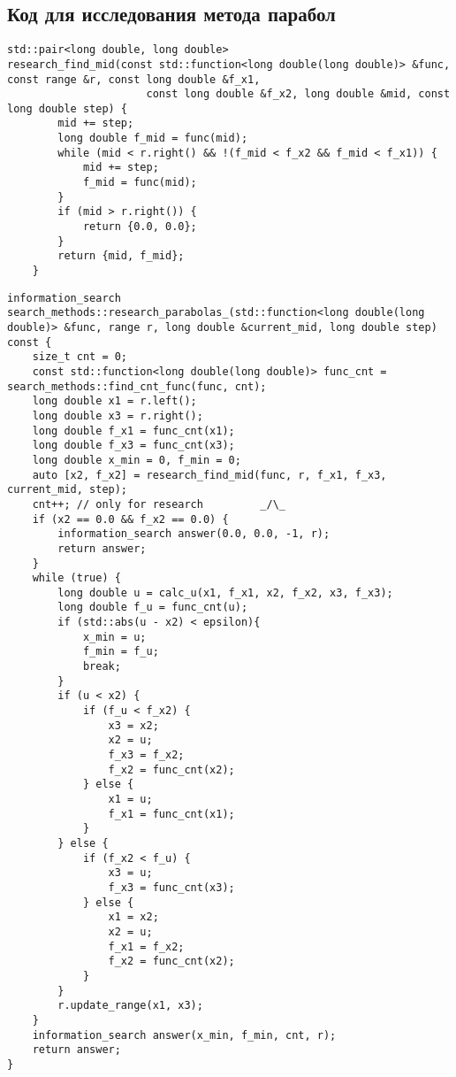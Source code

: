 \newpage
\subsection{Код для исследования метода парабол}
\begin{lstlisting}
std::pair<long double, long double>
research_find_mid(const std::function<long double(long double)> &func, const range &r, const long double &f_x1,
                      const long double &f_x2, long double &mid, const long double step) {
        mid += step;
        long double f_mid = func(mid);
        while (mid < r.right() && !(f_mid < f_x2 && f_mid < f_x1)) {
            mid += step;
            f_mid = func(mid);
        }
        if (mid > r.right()) {
            return {0.0, 0.0};
        }
        return {mid, f_mid};
    }
\end{lstlisting}

\begin{lstlisting}
information_search search_methods::research_parabolas_(std::function<long double(long double)> &func, range r, long double &current_mid, long double step) const {
    size_t cnt = 0;
    const std::function<long double(long double)> func_cnt = search_methods::find_cnt_func(func, cnt);
    long double x1 = r.left();
    long double x3 = r.right();
    long double f_x1 = func_cnt(x1);
    long double f_x3 = func_cnt(x3);
    long double x_min = 0, f_min = 0;
    auto [x2, f_x2] = research_find_mid(func, r, f_x1, f_x3, current_mid, step);
    cnt++; // only for research         _/\_
    if (x2 == 0.0 && f_x2 == 0.0) {
        information_search answer(0.0, 0.0, -1, r);
        return answer;
    }
    while (true) {
        long double u = calc_u(x1, f_x1, x2, f_x2, x3, f_x3);
        long double f_u = func_cnt(u);
        if (std::abs(u - x2) < epsilon){
            x_min = u;
            f_min = f_u;
            break;
        }
        if (u < x2) {
            if (f_u < f_x2) {
                x3 = x2;
                x2 = u;
                f_x3 = f_x2;
                f_x2 = func_cnt(x2);
            } else {
                x1 = u;
                f_x1 = func_cnt(x1);
            }
        } else {
            if (f_x2 < f_u) {
                x3 = u;
                f_x3 = func_cnt(x3);
            } else {
                x1 = x2;
                x2 = u;
                f_x1 = f_x2;
                f_x2 = func_cnt(x2);
            }
        }
        r.update_range(x1, x3);
    }
    information_search answer(x_min, f_min, cnt, r);
    return answer;
}
\end{lstlisting}

